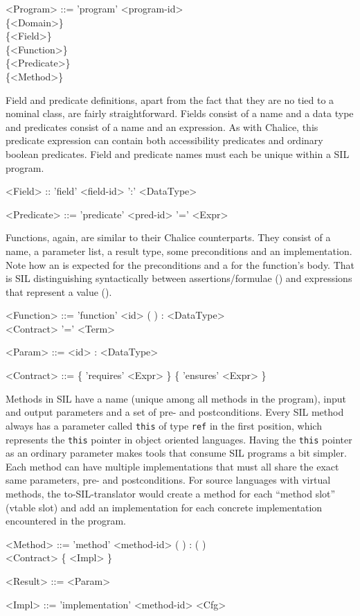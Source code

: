 \begin{grammar}
<Program> ::= 'program' <program-id> \\ 
 \{<Domain>\} \\
\{<Field>\} \\
 \{<Function>\} \\
 \{<Predicate>\} \\
 \{<Method>\} 
\end{grammar}

Field and predicate definitions, apart from the fact that they are no tied to a nominal class, are fairly straightforward. Fields consist of a name and a data type and predicates consist of a name and an expression. 
As with Chalice, this predicate expression can contain both accessibility predicates and ordinary boolean predicates.
Field and predicate names must each be unique within a SIL program.

\begin{grammar}
<Field> :: 'field' <field-id> ':' <DataType>

<Predicate> ::= 'predicate' <pred-id> '=' <Expr>
\end{grammar}

Functions, again, are similar to their Chalice counterparts.
They consist of a name, a parameter list, a result type, some preconditions and an implementation.
Note how an  is expected for the preconditions and a  for the function's body.
That is SIL distinguishing syntactically between assertions/formulae () and expressions that represent a value ().
\begin{grammar}
<Function> ::= 'function' <id> (  ) : <DataType> \\
	<Contract> '=' <Term>

<Param> ::= <id> : <DataType>

<Contract> ::= \{ 'requires' <Expr> \} \{ 'ensures' <Expr> \}
\end{grammar}

Methods in SIL have a name (unique among all methods in the program), input and output parameters and a set of pre- and postconditions. 
Every SIL method always has a parameter called \lstinline[language=SIL]!this! of type \lstinline[language=SIL]!ref! in the first position, which represents the \lstinline[language=Chalice]!this! pointer in object oriented languages. 
Having the \lstinline[language=SIL]!this! pointer as an ordinary parameter makes tools that consume SIL programs a bit simpler.
Each method can have multiple implementations that must all share the exact same parameters, pre- and postconditions.
For source languages with virtual methods, the to-SIL-translator would create a method for each ``method slot'' (vtable slot) and add an implementation for each concrete implementation encountered in the program.
\begin{grammar}
<Method> ::= 'method' <method-id> (  ) : (  )\\
 <Contract> \{ <Impl> \}

<Result> ::= <Param>

<Impl> ::= 'implementation' <method-id> <Cfg>
\end{grammar}

